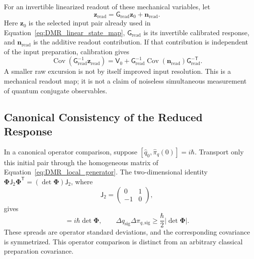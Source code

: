 For an invertible linearized readout of these mechanical variables, let
\begin{equation}
 \mathbf z_{\mathrm{read}}=\mathsf G_{\mathrm{read}}\mathbf z_0
 +\mathbf n_{\mathrm{read}}.
\end{equation}
Here $\mathbf z_0$ is the selected input pair already used in Equation~\eqref{eq:DMR_linear_state_map}, $\mathsf G_{\mathrm{read}}$ is its invertible calibrated response, and $\mathbf n_{\mathrm{read}}$ is the additive readout contribution. If that contribution is independent of the input preparation, calibration gives
\begin{equation}
 \boxed{
 \operatorname{Cov}\!\left(\mathsf G_{\mathrm{read}}^{-1}
 \mathbf z_{\mathrm{read}}\right)
 =\mathsf V_0
 +\mathsf G_{\mathrm{read}}^{-1}
 \operatorname{Cov}(\mathbf n_{\mathrm{read}})
 \mathsf G_{\mathrm{read}}^{-\mathsf T}
 }.
\label{eq:DMR_calibrated_covariance}
\end{equation}
A smaller raw excursion is not by itself improved input resolution. This is a mechanical readout map; it is not a claim of noiseless simultaneous measurement of quantum conjugate observables.

\subsection{Canonical Consistency of the Reduced Response}

In a canonical operator comparison, suppose $[\widehat q_0,\widehat\pi_q(0)]=i\hbar$. Transport only this initial pair through the homogeneous matrix of Equation~\eqref{eq:DMR_local_generator}. The two-dimensional identity $\boldsymbol\Phi\mathsf J_2\boldsymbol\Phi^{\mathsf T}=(\det\boldsymbol\Phi)\mathsf J_2$, where
\begin{equation}
 \mathsf J_2=\begin{pmatrix}0&1\\-1&0\end{pmatrix},
\end{equation}
gives
\begin{equation}
 [\widehat q_{\mathrm{sig}},\widehat\pi_{q,\mathrm{sig}}]
 =i\hbar\det\boldsymbol\Phi,
 \qquad
 \Delta q_{\mathrm{sig}}\Delta \pi_{q,\mathrm{sig}}
 \geq\frac{\hbar}{2}|\det\boldsymbol\Phi|.
\label{eq:DMR_signal_bracket}
\end{equation}
These spreads are operator standard deviations, and the corresponding covariance is symmetrized. This operator comparison is distinct from an arbitrary classical preparation covariance.

